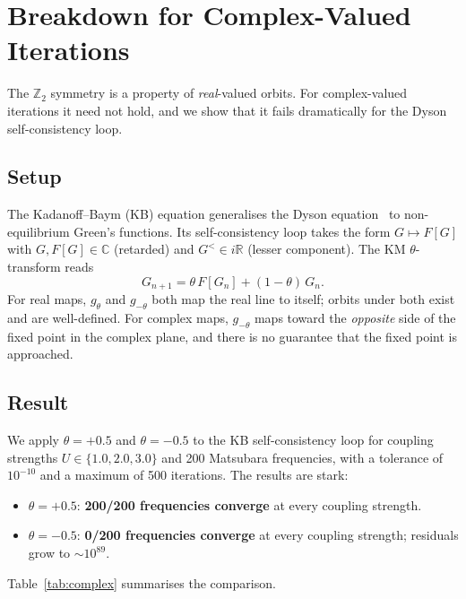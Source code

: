 \documentclass[aps,pre,twocolumn,superscriptaddress,nofootinbib,
               longbibliography,floatfix]{revtex4-2}
\theoremstyle{plain}
\theoremstyle{remark}
\begin{document}
\section{Breakdown for Complex-Valued Iterations}
\label{sec:complex}

The $\mathbb{Z}_2$ symmetry is a property of \emph{real}-valued
orbits.  For complex-valued iterations it need not hold, and
we show that it fails dramatically for the Dyson self-consistency
loop.

\subsection{Setup}

The Kadanoff--Baym (KB) equation generalises the Dyson
equation~\cite{KadanoffBaym1962} to non-equilibrium Green's
functions.  Its self-consistency loop takes the form
$G \mapsto F[G]$ with $G, F[G] \in \mathbb{C}$ (retarded) and
$G^{<} \in i\mathbb{R}$ (lesser component).  The KM
$\theta$-transform reads
%
\begin{equation}
  G_{n+1} = \theta\, F[G_n] + (1-\theta)\, G_n.
  \label{eq:km-kb}
\end{equation}
%
For real maps, $g_\theta$ and $g_{-\theta}$ both map the real
line to itself; orbits under both exist and are well-defined.
For complex maps, $g_{-\theta}$ maps toward the \emph{opposite}
side of the fixed point in the complex plane, and there is no
guarantee that the fixed point is approached.

\subsection{Result}

We apply $\theta = +0.5$ and $\theta = -0.5$ to the KB
self-consistency loop for coupling strengths
$U \in \{1.0, 2.0, 3.0\}$ and 200 Matsubara frequencies,
with a tolerance of $10^{-10}$ and a maximum of 500 iterations.
The results are stark:
%
\begin{itemize}
  \item $\theta = +0.5$: \textbf{200/200 frequencies converge}
    at every coupling strength.
  \item $\theta = -0.5$: \textbf{0/200 frequencies converge}
    at every coupling strength; residuals grow to
    $\sim 10^{89}$.
\end{itemize}
%
Table~\ref{tab:complex} summarises the comparison.
\end{document}
